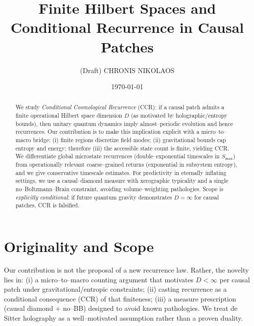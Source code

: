\documentclass[12pt]{article}
\title{Finite Hilbert Spaces and Conditional Recurrence in Causal Patches}
\author{(Draft) CHRONIS NIKOLAOS}
\affil[1]{Department of Computer Science and Engineering, University of Crete}
\date{\today}
\theoremstyle{remark}
\begin{document}
\maketitle

\begin{abstract}
We study \emph{Conditional Cosmological Recurrence} (CCR): if a causal patch admits a finite operational Hilbert space dimension $D$ (as motivated by holographic/entropy bounds), then unitary quantum dynamics imply almost–periodic evolution and hence recurrences. 
Our contribution is to make this implication explicit with a micro–to–macro bridge: (i) finite regions discretize field modes; (ii) gravitational bounds cap entropy and energy; therefore (iii) the accessible state count is finite, yielding CCR. 
We differentiate global microstate recurrences (double–exponential timescales in $S_{\max}$) from operationally relevant coarse–grained returns (exponential in subsystem entropy), and we give conservative timescale estimates. 
For predictivity in eternally inflating settings, we use a causal–diamond measure with xerographic typicality and a single no–Boltzmann–Brain constraint, avoiding volume–weighting pathologies. 
Scope is \emph{explicitly conditional}: if future quantum gravity demonstrates $D=\infty$ for causal patches, CCR is falsified.
\end{abstract}


\section*{Originality and Scope}

Our contribution is not the proposal of a new recurrence law. Rather, the novelty lies in:
(i) a micro–to–macro counting argument that motivates $D < \infty$ per causal patch under
gravitational/entropic constraints;
(ii) casting recurrence as a conditional consequence (CCR) of that finiteness;
(iii) a measure prescription (causal diamond + no–BB) designed to avoid known pathologies.
We treat de Sitter holography as a well–motivated assumption rather than a proven duality.

\begin{center}
\end{center}
\end{document}
